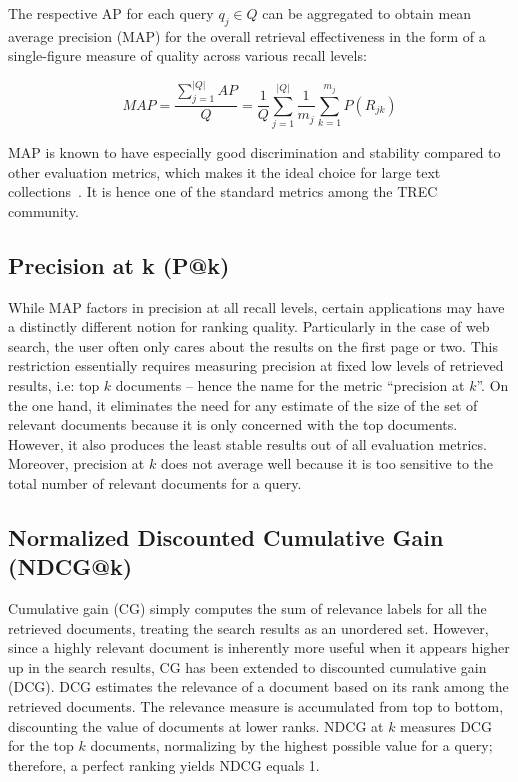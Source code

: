 The respective AP for each query $ q_{j} \in Q $ can be aggregated to obtain mean average precision (MAP) for the overall retrieval effectiveness in the form of a single-figure measure of quality across various recall levels:

\begin{equation}
MAP = \frac{\sum^{|Q|} _{j = 1} AP}{Q} = \frac{1}{Q} \sum^{|Q|} _{j = 1} \frac{1}{m_j} \sum^{m_j} _{k = 1} P(R_{jk})
\end{equation}


MAP is known to have especially good discrimination and stability compared to other evaluation metrics, which makes it the ideal choice for large text collections~\cite{manning2010introduction}.
It is hence one of the standard metrics among the TREC community.

\subsection{Precision at k (P@k)}

While MAP factors in precision at all recall levels, certain applications may have a distinctly different notion for ranking quality.
Particularly in the case of web search, the user often only cares about the results on the first page or two.
This restriction essentially requires measuring precision at fixed low levels of retrieved results, i.e: top $ k $ documents -- hence the name for the metric ``precision at $ k $''.
On the one hand, it eliminates the need for any estimate of the size of the set of relevant documents because it is only concerned with the top documents.
However, it also produces the least stable results out of all evaluation metrics.
Moreover, precision at $ k $ does not average well because it is too sensitive to the total number of relevant documents for a query.

\subsection{Normalized Discounted Cumulative Gain (NDCG@k)}

Cumulative gain (CG) simply computes the sum of relevance labels for all the retrieved documents, treating the search results as an unordered set.
However, since a highly relevant document is inherently more useful when it appears higher up in the search results, CG has been extended to discounted cumulative gain (DCG).
DCG estimates the relevance of a document based on its rank among the retrieved documents.
The relevance measure is accumulated from top to bottom, discounting the value of documents at lower ranks.
NDCG at $ k $ measures DCG for the top $ k $ documents, normalizing by the highest possible value for a query; therefore, a perfect ranking yields NDCG equals 1.

